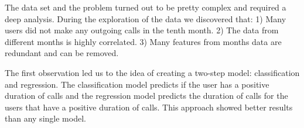 \documentclass[
]{article}
\begin{document}
The data set and the problem turned out to be pretty complex and
required a deep analysis. During the exploration of the data we
discovered that: 1) Many users did not make any outgoing calls in the
tenth month. 2) The data from different months is highly correlated. 3)
Many features from months data are redundant and can be removed.

The first observation led us to the idea of creating a two-step model:
classification and regression. The classification model predicts if the
user has a positive duration of calls and the regression model predicts
the duration of calls for the users that have a positive duration of
calls. This approach showed better results than any single model.
\end{document}
